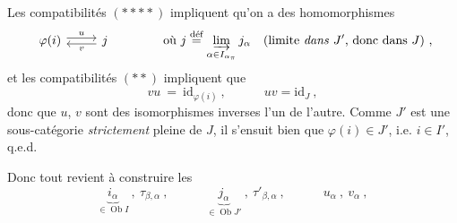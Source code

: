 \documentclass[11pt]{article}
\newcommand{\msp}[1]{\marginpar{\footnotesize [#1]}}
\newcommand{\Ob}{\operatorname{Ob}}
\begin{document}
\msp{page 315}\noindent Les compatibilités $(****)$ impliquent qu'on a des homomorphismes
\[
\begin{tikzcd}
\varphi(i) \arrow[r, shift left, "u"] & j \arrow[l, shift left, "v"]
\end{tikzcd}
\qquad\qquad \text{où } j \overset{\text{déf}}{=} \varinjlim_{\alpha\in I_{\alpha_\pi}} j_\alpha \quad \text{(limite \textit{dans} $J'$, donc dans $J$)} \ ,
\]
et les compatibilités $(**)$ impliquent que
\[
vu \ = \ \mathrm{id}_{\varphi(i)} \ , \qquad\quad uv = \mathrm{id}_J \ , %
\]
donc que $u$, $v$ sont des isomorphismes inverses l'un de l'autre. Comme $J'$ est une sous-catégorie \textit{strictement} pleine de $J$, il s'ensuit bien que $\varphi(i) \in J'$, i.e. $i \in I'$, q.e.d.

Donc tout revient à construire les
\[
\underbrace{i_\alpha}_{\in \Ob I} \ , \ \tau_{\beta,\alpha} \ , \qquad\quad \underbrace{j_\alpha}_{\in \Ob J'} \ , \ \tau'_{\beta,\alpha} \ , \qquad\quad u_\alpha \ , \ v_\alpha \ ,
\]
\end{document}
